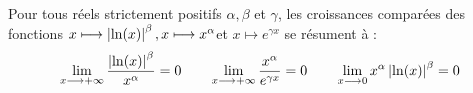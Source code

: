 \begin{defprop}
    Pour tous réels strictement positifs \(\alpha , \beta \) et \(\gamma \), les croissances comparées des fonctions  \(x \longmapsto \left\lvert\ln (x)\right\rvert^{\beta} , x \longmapsto x^{\alpha} \)et \(x \mapsto e^{\gamma x}\) se résument à :
    \[\lim_{x\longrightarrow+\infty} \frac{\left\lvert\ln (x)\right\rvert^{\beta}}{x^{\alpha}} = 0 \qquad \lim_{x\longrightarrow+\infty} \frac{x^{\alpha}}{e^{\gamma x}} = 0 \qquad \lim_{x\longrightarrow 0} x^{\alpha}\left\lvert\ln (x)\right\rvert^{\beta} = 0 \] 

\end{defprop}